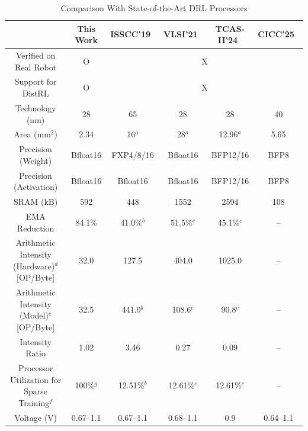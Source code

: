 \begin{table}[t]
\centering
\caption{Comparison With State-of-the-Art DRL Processors}
\label{tab:comparison}
\renewcommand{\arraystretch}{2}
\begin{tabular}{|c|c|c|c|c|c|}
\hline
 & \textbf{This Work} & \textbf{ISSCC'19~\cite{ISSCC19}} &
   \textbf{VLSI'21~\cite{VLSI21}} & \textbf{TCAS-II'24~\cite{TCASII24}} &
   \textbf{CICC'25~\cite{CICC25}} \\
\hline
Verified on Real Robot
  & O
  & \multicolumn{4}{c|}{X} \\ \hline

Support for DistRL
  & O
  & \multicolumn{4}{c|}{X} \\ \hline
Technology (nm)                              & 28 & 65 & 28 & 28 & 40 \\ \hline
Area (mm$^{2}$)                              & 2.34 & 16$^a$ & 28$^a$ & 12.96$^a$ & 5.65 \\ \hline
Precision (Weight)                           & Bfloat16 & FXP4/8/16 & Bfloat16 & BFP12/16 & BFP8 \\ \hline
Precision (Activation)                       & Bfloat16 & Bfloat16  & Bfloat16 & BFP12/16 & BFP8 \\ \hline
SRAM (kB)                                    & 592 & 448 & 1552 & 2594 & 108 \\ \hline
EMA Reduction                                & 84.1\% & 41.0\%$^b$ & 51.5\%$^c$ & 45.1\%$^c$ & -- \\ \hline
\makecell{Arithmetic Intensity (Hardware)$^d$ \\ {[OP/Byte]}}    & 32.0 & 127.5 & 404.0 & 1025.0 & -- \\ \hline
\makecell{Arithmetic Intensity (Model)$^e$ \\ {[OP/Byte]}}      & 32.5 & 441.0$^b$ & 108.6$^c$ & 90.8$^c$ & -- \\ \hline
Intensity Ratio                              & 1.02 & 3.46 & 0.27 & 0.09 & -- \\ \hline
\makecell{Processor Utilization \\ for Sparse Training$^f$} & 100\%$^g$ & 12.51\%$^b$ & 12.61\%$^c$ & 12.61\%$^c$ & -- \\ \hline
Voltage (V)                                  & 0.67–1.1 & 0.67–1.1 & 0.68–1.1 & 0.9 & 0.64–1.1 \\ \hline

\end{tabular}
\end{table}
